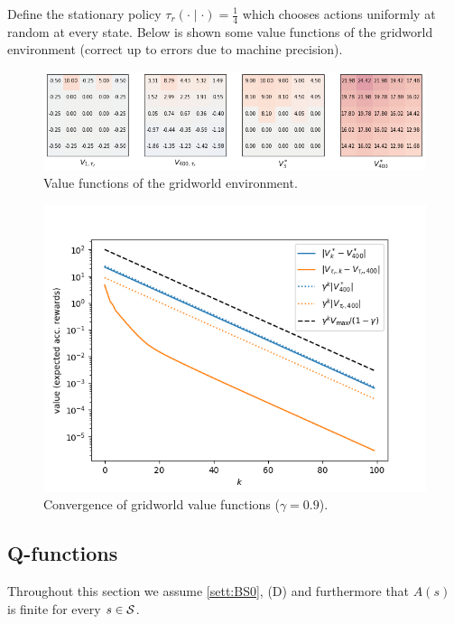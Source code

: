 \begin{example}[Gridworld]
  Define the stationary policy $\tau_r(\cdot \mid \cdot) = \frac{1}{4}$ which
  chooses actions uniformly at random at every state.
  Below is shown some value functions of the gridworld environment
  (correct up to errors due to machine precision).

  \begin{figure}[h]
    \centering
    \includegraphics[scale=0.8]{figs/gridworld1.png}
    \caption{Value functions of the gridworld environment.}
    \label{fig:gw1}
  \end{figure}

  \begin{figure}[h]
    \centering
    \includegraphics[scale=0.7]{figs/gridworld2.png}
    \caption{Convergence of gridworld value functions
    ($\gamma = 0.9$).}
    \label{fig:gw2}
  \end{figure}

  \label{ex:gridworld}
\end{example}

\subsection{Q-functions}
Throughout this section we assume \cref{sett:BS0}, (D) and furthermore that
$A(s)$ is finite for every $s \in \mathcal{S}$.

